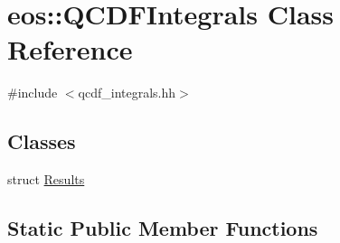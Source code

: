 \hypertarget{classeos_1_1QCDFIntegrals}{
\section{eos::QCDFIntegrals Class Reference}
\label{classeos_1_1QCDFIntegrals}
}


{\ttfamily \#include $<$qcdf\_\-integrals.hh$>$}\subsection*{Classes}
\begin{DoxyCompactItemize}
\item 
struct \hyperlink{structeos_1_1QCDFIntegrals_1_1Results}{Results}
\end{DoxyCompactItemize}
\subsection*{Static Public Member Functions}

